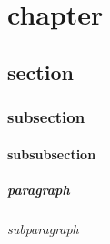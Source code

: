 
\chapter{chapter}
\section{section}
\subsection{subsection}
\subsubsection{subsubsection}
\paragraph{paragraph}
\subparagraph{subparagraph}


